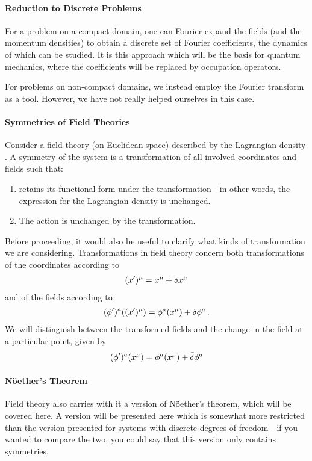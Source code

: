 
\paragraph{Reduction to Discrete Problems}
For a problem on a compact domain, one can Fourier expand the fields (and the momentum densities) to obtain a discrete set of Fourier coefficients, the dynamics of which can be studied. It is this approach which will be the basis for quantum mechanics, where the coefficients will be replaced by occupation operators.

For problems on non-compact domains, we instead employ the Fourier transform as a tool. However, we have not really helped ourselves in this case.

\paragraph{Symmetries of Field Theories}
Consider a field theory (on Euclidean space) described by the Lagrangian density \lag. A symmetry of the system is a transformation of all involved coordinates and fields such that:
\begin{enumerate}
	\item \lag retains its functional form under the transformation - in other words, the expression for the Lagrangian density is unchanged.
	\item The action is unchanged by the transformation.
\end{enumerate}

Before proceeding, it would also be useful to clarify what kinds of transformation we are considering. Transformations in field theory concern both transformations of the coordinates according to
\begin{align*}
	(x^{\prime})^{\mu} = x^{\mu} + \var{x^{\mu}}
\end{align*}
and of the fields according to
\begin{align*}
	(\phi^{\prime})^{a}((x^{\prime})^{\mu}) = \phi^{a}(x^{\mu}) + \var{\phi^{a}}.
\end{align*}
We will distinguish between the transformed fields and the change in the field at a particular point, given by
\begin{align*}
	(\phi^{\prime})^{a}(x^{\mu}) = \phi^{a}(x^{\mu}) + \bar{\delta}\phi^{a}
\end{align*}

\paragraph{Nöether's Theorem}
Field theory also carries with it a version of Nöether's theorem, which will be covered here. A version will be presented here which is somewhat more restricted than the version presented for systems with discrete degrees of freedom - if you wanted to compare the two, you could say that this version only contains symmetries.

